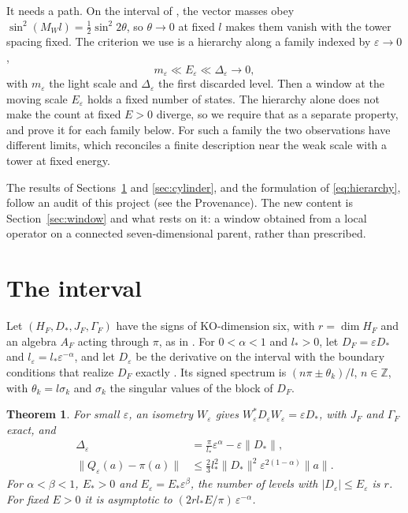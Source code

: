 \documentclass[aps,prd,reprint,onecolumn,nofootinbib,amsmath,amssymb,floatfix]{revtex4-2}
\theoremstyle{plain}
\newtheorem{theorem}{Theorem}
\begin{document}
It needs a path. On the interval of \cite{boundarynote}, the vector masses obey $\sin^2(M_Wl)=\tfrac12\sin^2 2\theta$, so $\theta\to0$ at fixed $l$ makes them vanish with the tower spacing fixed. The criterion we use is a hierarchy along a family indexed by $\varepsilon\to0$,
\begin{equation}\label{eq:hierarchy}
m_\varepsilon\ll E_\varepsilon\ll\Delta_\varepsilon\to0,
\end{equation}
with $m_\varepsilon$ the light scale and $\Delta_\varepsilon$ the first discarded level. Then a window at the moving scale $E_\varepsilon$ holds a fixed number of states. The hierarchy alone does not make the count at fixed $E>0$ diverge, so we require that as a separate property, and prove it for each family below. For such a family the two observations have different limits, which reconciles a finite description near the weak scale with a tower at fixed energy.

The results of Sections~\ref{sec:interval} and \ref{sec:cylinder}, and the formulation of \eqref{eq:hierarchy}, follow an audit of this project (see the Provenance). The new content is Section~\ref{sec:window} and what rests on it: a window obtained from a local operator on a connected seven-dimensional parent, rather than prescribed.

\section{The interval}\label{sec:interval}

Let $(H_F,D_*,J_F,\Gamma_F)$ have the signs of KO-dimension six, with $r=\dim H_F$ and an algebra $A_F$ acting through $\pi$, as in \cite{boundarynote}. For $0<\alpha<1$ and $l_*>0$, let $D_F=\varepsilon D_*$ and $l_\varepsilon=l_*\varepsilon^{-\alpha}$, and let $D_\varepsilon$ be the derivative on the interval with the boundary conditions that realize $D_F$ exactly \cite{boundarynote}. Its signed spectrum is $(n\pi\pm\theta_k)/l$, $n\in\mathbb Z$, with $\theta_k=l\sigma_k$ and $\sigma_k$ the singular values of the block of $D_F$.

\begin{theorem}\label{thm:interval}
For small $\varepsilon$, an isometry $W_\varepsilon$ gives $W_\varepsilon^*D_\varepsilon W_\varepsilon=\varepsilon D_*$, with $J_F$ and $\Gamma_F$ exact, and
\begin{equation}
\begin{aligned}
\Delta_\varepsilon&=\frac{\pi}{l_*}\varepsilon^\alpha-\varepsilon\|D_*\|,\\
\|Q_\varepsilon(a)-\pi(a)\|&\le\tfrac23l_*^2\|D_*\|^2\varepsilon^{2(1-\alpha)}\|a\|.
\end{aligned}
\end{equation}
For $\alpha<\beta<1$, $E_*>0$ and $E_\varepsilon=E_*\varepsilon^\beta$, the number of levels with $|D_\varepsilon|\le E_\varepsilon$ is $r$. For fixed $E>0$ it is asymptotic to $(2rl_*E/\pi)\,\varepsilon^{-\alpha}$.
\end{theorem}
\end{document}
